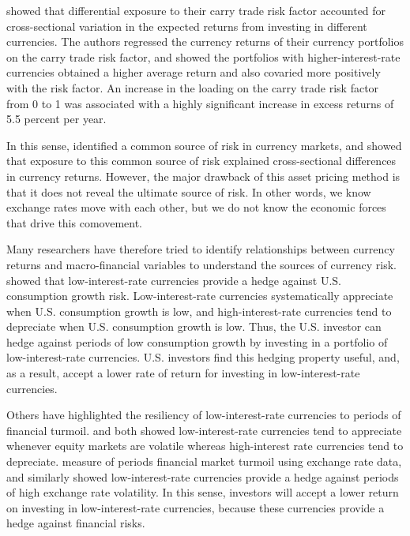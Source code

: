 \documentclass{ar-1col}
\begin{document}
\citet{LustigRoussanovVerdelhan2011} showed that differential exposure to their carry trade risk factor accounted for cross-sectional variation in the expected returns from investing in different currencies. The authors regressed the currency returns of their currency portfolios on the carry trade risk factor, and showed the portfolios with higher-interest-rate currencies obtained a higher average return and also covaried more positively with the risk factor. An increase in the loading on the carry trade risk factor from 0 to 1 was associated with a highly significant increase in excess returns of 5.5 percent per year.

In this sense, \citet{LustigRoussanovVerdelhan2011} identified a common source of risk in currency markets, and showed that exposure to this common source of risk explained cross-sectional differences in currency returns. However, the major drawback of this asset pricing method is that it does not reveal the ultimate source of risk. In other words, we know exchange rates move with each other, but we do not know the economic forces that drive this comovement.

Many researchers have therefore tried to identify relationships between currency returns and macro-financial variables to understand the sources of currency risk. \citet{LustigVerdelhan2007} showed that low-interest-rate currencies provide a hedge against U.S. consumption growth risk. Low-interest-rate currencies systematically appreciate when U.S. consumption growth is low, and high-interest-rate currencies tend to depreciate when U.S. consumption growth is low. Thus, the U.S. investor can hedge against periods of low consumption growth by investing in a portfolio of low-interest-rate currencies. U.S. investors find this hedging property useful, and, as a result, accept a lower rate of return for investing in low-interest-rate currencies.

Others have highlighted the resiliency of low-interest-rate currencies to periods of financial turmoil. \citet{LustigRoussanovVerdelhan2011} and \citet{CampbellMedeirosViceira2010} both showed low-interest-rate currencies tend to appreciate whenever equity markets are volatile whereas high-interest rate currencies tend to depreciate. \citet{Menkhoffetal2012} measure of periods financial market turmoil using exchange rate data, and similarly showed low-interest-rate currencies provide a hedge against periods of high exchange rate volatility. In this sense, investors will accept a lower return on investing in low-interest-rate currencies, because these currencies provide a hedge against financial risks.
\end{document}
